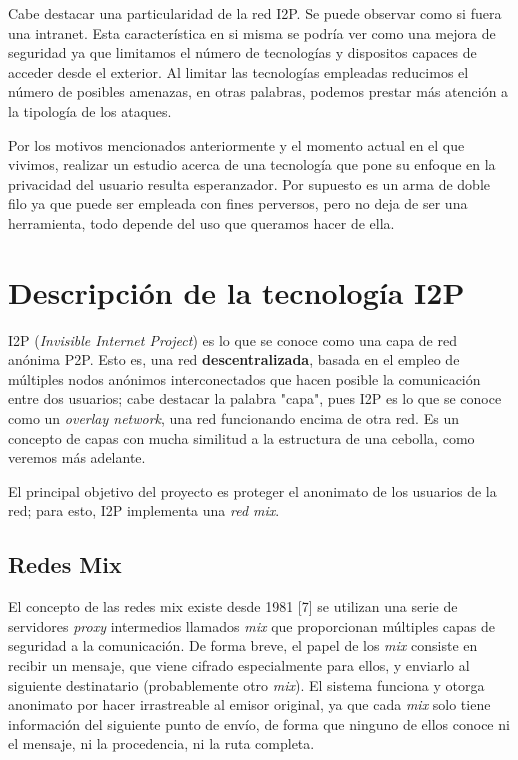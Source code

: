 \documentclass{article}
\begin{document}
Cabe destacar una particularidad de la red I2P. Se puede observar como si fuera una intranet. Esta característica en si misma se podría ver 
como una mejora de seguridad ya que limitamos el número de tecnologías y dispositos capaces de acceder desde el exterior. Al limitar las tecnologías 
empleadas reducimos el número de posibles amenazas, en otras palabras, podemos prestar más atención a la tipología de los ataques. 

Por los motivos mencionados anteriormente y el momento actual en el que vivimos, realizar un estudio acerca de una tecnología que 
pone su enfoque en la privacidad del usuario resulta esperanzador. Por supuesto es un arma de doble filo ya que puede ser empleada con fines 
perversos, pero no deja de ser una herramienta, todo depende del uso que queramos hacer de ella.

\pagebreak

\section{Descripción de la tecnología I2P}

I2P (\textit{Invisible Internet Project}) es lo que se conoce como una capa de red anónima P2P. Esto es, una red \textbf{descentralizada}, basada en el empleo de múltiples nodos anónimos interconectados
que hacen posible la comunicación entre dos usuarios; cabe destacar la palabra "capa", pues I2P es lo que se conoce como un \textit{overlay network}, una red funcionando encima de otra red. Es un concepto
de capas con mucha similitud a la estructura de una cebolla, como veremos más adelante.

El principal objetivo del proyecto es proteger el anonimato de los usuarios de la red; para esto, I2P implementa una \textit{red mix}.

\subsection{Redes Mix}
El concepto de las redes mix existe desde 1981 [7] se utilizan una serie de servidores \textit{proxy} intermedios llamados \textit{mix} que proporcionan múltiples
capas de seguridad a la comunicación. De forma breve, el papel de los \textit{mix} consiste en recibir un mensaje, que viene cifrado especialmente para ellos,
y enviarlo al siguiente destinatario (probablemente otro \textit{mix}).
El sistema funciona y otorga anonimato por hacer irrastreable al emisor original, ya que cada \textit{mix} solo tiene información del siguiente punto de envío, de forma que ninguno de ellos conoce
ni el mensaje, ni la procedencia, ni la ruta completa.
\end{document}
